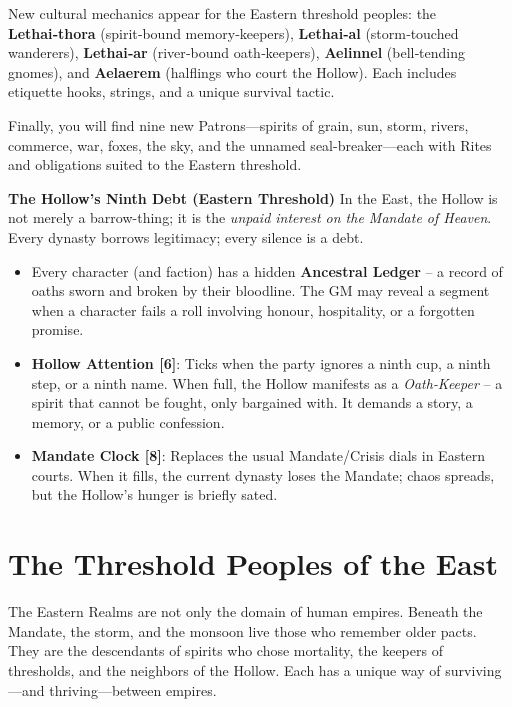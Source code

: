 \documentclass[12pt]{book}
\begin{document}
New cultural mechanics appear for the Eastern threshold peoples: the \textbf{Lethai‑thora} (spirit‑bound memory‑keepers), \textbf{Lethai‑al} (storm‑touched wanderers), \textbf{Lethai‑ar} (river‑bound oath‑keepers), \textbf{Aelinnel} (bell‑tending gnomes), and \textbf{Aelaerem} (halflings who court the Hollow). Each includes etiquette hooks, strings, and a unique survival tactic.

Finally, you will find nine new Patrons---spirits of grain, sun, storm, rivers, commerce, war, foxes, the sky, and the unnamed seal-breaker---each with Rites and obligations suited to the Eastern threshold.

\begin{infobox}
\textbf{The Hollow’s Ninth Debt (Eastern Threshold)}
In the East, the Hollow is not merely a barrow-thing; it is the \textit{unpaid interest on the Mandate of Heaven}. Every dynasty borrows legitimacy; every silence is a debt.
\begin{itemize}
    \item Every character (and faction) has a hidden \textbf{Ancestral Ledger} – a record of oaths sworn and broken by their bloodline. The GM may reveal a segment when a character fails a roll involving honour, hospitality, or a forgotten promise.
    \item \textbf{Hollow Attention [6]}: Ticks when the party ignores a ninth cup, a ninth step, or a ninth name. When full, the Hollow manifests as a \textit{Oath‑Keeper} – a spirit that cannot be fought, only bargained with. It demands a story, a memory, or a public confession.
    \item \textbf{Mandate Clock [8]}: Replaces the usual Mandate/Crisis dials in Eastern courts. When it fills, the current dynasty loses the Mandate; chaos spreads, but the Hollow’s hunger is briefly sated.
\end{itemize}
\end{infobox}

\chapter{The Threshold Peoples of the East}

The Eastern Realms are not only the domain of human empires. Beneath the Mandate, the storm, and the monsoon live those who remember older pacts. They are the descendants of spirits who chose mortality, the keepers of thresholds, and the neighbors of the Hollow. Each has a unique way of surviving---and thriving---between empires.
\end{document}

